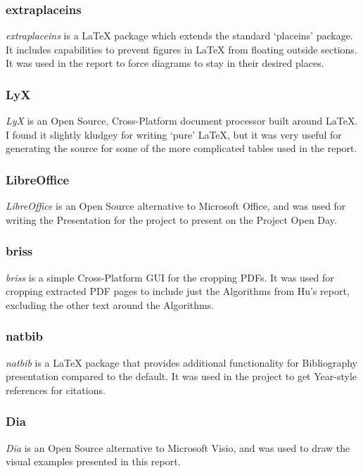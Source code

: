 \documentclass[a4paper,11pt]{report}
\begin{document}
\subsubsection*{extraplaceins}
\emph{extraplaceins} \citep{prog:extraplaceins} is a \LaTeX{} package which extends the standard `placeins' package. It includes capabilities to prevent figures in \LaTeX{} from floating outside sections. It was used in the report to force diagrams to stay in their desired places.

\subsubsection*{LyX}
\emph{LyX} \citep{prog:lyx} is an Open Source, Cross-Platform document processor built around \LaTeX{}. I found it slightly kludgey for writing `pure' \LaTeX{}, but it was very useful for generating the source for some of the more complicated tables used in the report. 

\subsubsection*{LibreOffice}
\emph{LibreOffice} \citep{prog:libreoffice} is an Open Source alternative to Microsoft Office, and was used for writing the Presentation for the project to present on the Project Open Day.

\subsubsection*{briss}
\emph{briss} \citep{prog:briss} is a simple Cross-Platform GUI for the cropping PDFs. It was used for cropping extracted PDF pages to include just the Algorithms from Hu's report, excluding the other text around the Algorithms.

\subsubsection*{natbib}
\emph{natbib} \citep{prog:natbib} is a \LaTeX{} package that provides additional functionality for Bibliography presentation compared to the default. It was used in the project to get Year-style references for citations.

\subsubsection*{Dia}
\emph{Dia} \citep{prog:dia} is an Open Source alternative to Microsoft Visio, and was used to draw the visual examples presented in this report.
\end{document}
